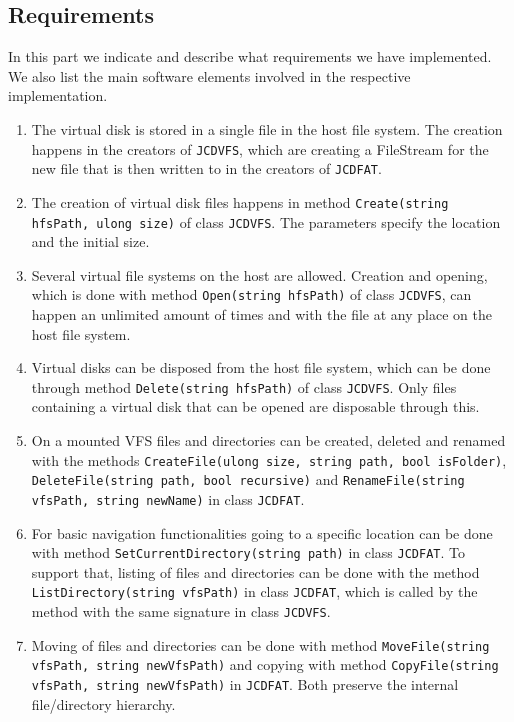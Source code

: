 \documentclass[11pt]{article}
\begin{document}
\subsection{Requirements}
In this part we indicate and describe what requirements we have implemented. We also list the main software elements involved in the respective implementation.


\begin{enumerate}
	\item The virtual disk is stored in a single file in the host file system. The creation happens in the creators of \texttt{JCDVFS}, which are creating a FileStream for the new file that is then written to in the creators of \texttt{JCDFAT}.
	\item The creation of virtual disk files happens in method \texttt{Create(string hfsPath, ulong size)} of class \texttt{JCDVFS}. The parameters specify the location and the initial size.
	\item Several virtual file systems on the host are allowed. Creation and opening, which is done with method \texttt{Open(string hfsPath)} of class \texttt{JCDVFS}, can happen an unlimited amount of times and with the file at any place on the host file system.
	\item Virtual disks can be disposed from the host file system, which can be done through method \texttt{Delete(string hfsPath)} of class \texttt{JCDVFS}. Only files containing a virtual disk that can be opened are disposable through this.
	\item On a mounted VFS files and directories can be created, deleted and renamed with the methods \texttt{CreateFile(ulong size, string path, bool isFolder)}, \texttt{DeleteFile(string path, bool recursive)} and \texttt{RenameFile(string vfsPath, string newName)} in class \texttt{JCDFAT}.
	\item For basic navigation functionalities going to a specific location can be done with method \texttt{SetCurrentDirectory(string path)} in class \texttt{JCDFAT}. To support that, listing of files and directories can be done with the method \texttt{ListDirectory(string vfsPath)} in class \texttt{JCDFAT}, which is called by the method with the same signature in class \texttt{JCDVFS}.
	\item Moving of files and directories can be done with method \texttt{MoveFile(string vfsPath, string newVfsPath)} and copying with method \texttt{CopyFile(string vfsPath, string newVfsPath)} in \texttt{JCDFAT}. Both preserve the internal file/directory hierarchy.

\end{enumerate}
\end{document}
